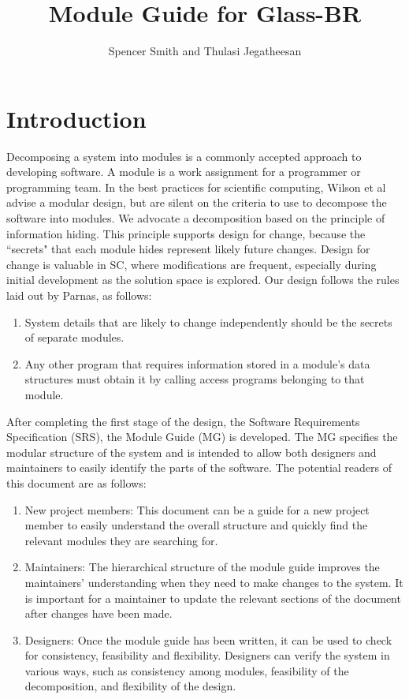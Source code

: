 \documentclass[12pt]{article}
\title{Module Guide for Glass-BR}
\author{Spencer Smith and Thulasi Jegatheesan}
\begin{document}
\maketitle
\tableofcontents
\newpage
\section{Introduction}
\label{Sec:I}
Decomposing a system into modules is a commonly accepted approach to developing software.  A module is a work assignment for a programmer or programming team. In the best practices for scientific computing, Wilson et al advise a modular design, but are silent on the criteria to use to decompose the software into modules.  We advocate a decomposition based on the principle of information hiding. This principle supports design for change, because the ``secrets" that each module hides represent likely future changes.  Design for change is valuable in SC, where modifications are frequent, especially during initial development as the solution space is explored.
Our design follows the rules laid out by Parnas, as follows:
\begin{enumerate}
\item{System details that are likely to change independently should be the secrets of separate modules.}
\item{Any other program that requires information stored in a module's data structures must obtain it by calling access programs belonging to that module.}
\end{enumerate}
After completing the first stage of the design, the Software Requirements Specification (SRS), the Module Guide (MG) is developed. The MG specifies the modular structure of the system and is intended to allow both designers and maintainers to easily identify the parts of the software.  The potential readers of this document are as follows:
\begin{enumerate}
\item{New project members: This document can be a guide for a new project member to easily understand the overall structure and quickly find the relevant modules they are searching for.}
\item{Maintainers: The hierarchical structure of the module guide improves the maintainers' understanding when they need to make changes to the system. It is important for a maintainer to update the relevant sections of the document after changes have been made.}
\item{Designers: Once the module guide has been written, it can be used to check for consistency, feasibility and flexibility. Designers can verify the system in various ways, such as consistency among modules, feasibility of the decomposition, and flexibility of the design.}
\end{enumerate}
\end{document}
